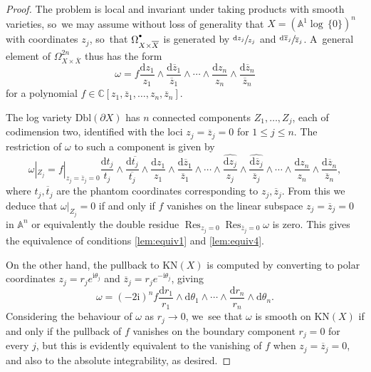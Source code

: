 \documentclass[JEP,XML,SOM,Unicode,NoFloatCountersInSection,published]{cedram}
\let\oldbullet\bullet
\renewcommand{\bullet}{{\raisebox{1pt}{$\scriptscriptstyle\oldbullet$}}}
\newcommand{\dslog}[1]{\sfrac{\dd#1}{#1}}
\theoremstyle{definition}
\theoremstyle{remark}
\newcommand{\CC}{\mathbb{C}}
\newcommand{\AF}{\mathbb{A}}
\newcommand{\logcyl}{\AF^1 \log\, \{0\}}
\renewcommand{\le}{\leqslant}
\newcommand{\iu}{\mathrm{i}}
\newcommand{\zb}{\overline{z}}
\newcommand{\dd}{\mathrm{d}}
\newcommand{\dlog}[1]{\frac{\dd#1}{#1}}
\DeclareMathOperator*{\res}{Res}
\newcommand{\cX}{\overline{X}}
\newcommand{\KN}[1]{\mathrm{KN}(#1)}
\newcommand{\Dbl}[1]{\mathrm{Dbl}(#1)}
\newcommand{\forms}[2][\bullet]{\Omega^{#1}_{#2}}
\begin{document}
\begin{proof}
The problem is local and invariant under taking products with smooth varieties, so~we may assume without loss of generality that $X = (\logcyl)^n$ with coordinates $z_j$, so~that $\forms{X\times\cX}$ is generated by $\dslog{z_j}$ and $\dslog{\zb_j}$. A~general element of $\forms[2n]{X\times\cX}$ thus has the form
\[
\omega = f \dlog{z_1} \wedge \dlog{\zb_1} \wedge \cdots \wedge \dlog{z_n}\wedge\dlog{\zb_n}
\]
for a polynomial $f \in \CC[z_1,\zb_1,\ldots,z_n,\zb_n]$.

The log variety $\Dbl{\partial X}$ has $n$ connected components $Z_1,\ldots,Z_j$, each of codimension two, identified with the loci $z_j=\zb_j = 0$ for $1 \le j \le n$.
The restriction of $\omega$ to such a component is given by
\[
\omega|_{Z_j} = f|_{z_j=\zb_j=0} \dlog{t_j}\wedge\dlog{\overline{t_j}} \wedge \dlog{z_1}\wedge\dlog{\zb_1} \wedge \cdots \wedge \widehat{\dlog{z_j}}\wedge\widehat{\dlog{\zb_j}} \wedge \cdots\wedge \dlog{z_n}\wedge\dlog{\zb_n},
\]
where $t_j,\overline{t}_j$ are the phantom coordinates corresponding to $z_j,\zb_j$. From this we deduce that $\omega|_{Z_j} = 0$ if and only if $f$ vanishes on the linear subspace $z_j=\zb_j = 0$ in $\AF^n$ or equivalently the double residue $\res_{z_j=0}\res_{\zb_j=0} \omega$ is zero. This gives the equivalence of conditions \eqref{lem:equiv1} and \eqref{lem:equiv4}.

On the other hand, the pullback to $\KN{X}$ is computed by converting to polar coordinates $z_j = r_j e^{\iu \theta_j}$ and $\zb_j = r_j e^{-\iu\theta_j}$, giving
\[
\omega = (-2 \iu)^n f \dlog{r_1}\wedge \dd\theta_1 \wedge \cdots \wedge \dlog{r_n}\wedge \dd\theta_n.
\]
Considering the behaviour of $\omega$ as $r_j \to 0$, we~see that $\omega$ is smooth on $\KN{X}$ if and only if the pullback of $f$ vanishes on the boundary component $r_j=0$ for every $j$, but this is evidently equivalent to the vanishing of $f$ when $z_j=\zb_j = 0$, and also to the absolute integrability, as desired.
\end{proof}
\end{document}
